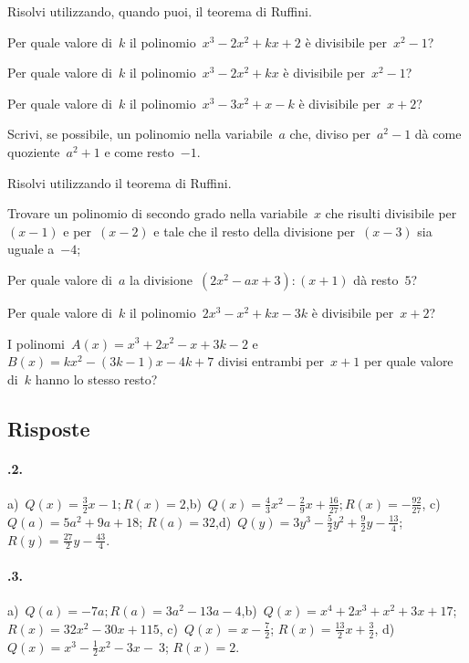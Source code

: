 \begin{esercizio}[\Ast]
\label{ese:12.17}
Risolvi utilizzando, quando puoi, il teorema di Ruffini.
 \begin{enumeratea}
 \item Per quale valore di~$k$ il polinomio~$x^{3}-2x^{2}+kx+2$ è divisibile per~$x^{2}-1$?
 \item Per quale valore di~$k$ il polinomio~$x^{3}-2x^{2}+kx$ è divisibile per~$x^{2}-1$?
 \item Per quale valore di~$k$ il polinomio~$x^{3}-3x^{2}+x-k$ è divisibile per~$x+2$?
 \item Scrivi, se possibile, un polinomio nella variabile~$a$ che, diviso per~$a^{2}-1$ dà come quoziente~$a^{2}+1$ e come resto~$-1$.
 \end{enumeratea}
\end{esercizio}

\begin{esercizio}[\Ast]
\label{ese:12.18}
Risolvi utilizzando il teorema di Ruffini.
 \begin{enumeratea}
 \item Trovare un polinomio di secondo grado nella variabile~$x$ che risulti divisibile per~$(x-1)$ e per~$(x-2)$ e tale che
     il resto della divisione per~$(x-3)$ sia uguale a~$-4$;
 \item Per quale valore di~$a$ la divisione~$\left(2x^{2}-ax+3\right):(x+1)$ dà resto~$5$?
 \item Per quale valore di~$k$ il polinomio~$2x^{3}-x^{2}+kx-3k$ è divisibile per~$x+2$?
 \item I polinomi~$A(x)=x^3+2x^2-x+3k-2$ e~$B(x)=kx^2-(3k-1)x-4k+7$ divisi entrambi per~$x+1$ per quale valore di~$k$ hanno lo stesso resto?
 \end{enumeratea}
\end{esercizio}

\subsection{Risposte}
\paragraph{\thechapter.2.}
a)~$Q(x)=\frac{3}{2}x-1; R(x)=2$,\quad b)~$Q(x)=\frac{4}{3}x^{2}-\frac{2}{9}x+\frac{16}{27}; R(x)=-{\frac{92}{27}}$,\quad
c)~{$Q(a)=5a^{2}+9a+18$}; $R(a)=32$,\quad d)~$Q(y)=3y^{3}-\frac{5}{2}y^{2}+\frac{9}{2}y-\frac{13}{4}$; $R(y)=\frac{27}{2}y-\frac{43}{4}$.
\paragraph{\thechapter.3.}
a)~$Q(a)=-7a; R(a)=3a^{2}-13a-4$,\quad b)~$Q(x)=x^{4}+2x^{3}+x^{2}+3x+17$;\protect\\ ${R(x)=32x^{2}-30x+115}$,\quad
c)~$Q(x)=x-\frac{7}{2}$; $R(x)=\frac{13}{2}x+\frac{3}{2}$, d)~$Q(x)=x^{3}-\frac{1}{2}x^{2}-3x-~3$; $R(x)=2$.
